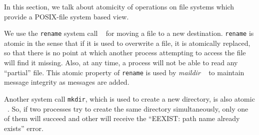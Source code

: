 In this section, we talk about atomicity of operations on file systems which provide a POSIX-file system based view.

We use the \texttt{rename} system call ~\cite{renamemanpage} for moving a file to a new destination. \texttt{rename} is atomic in the sense that if it is used to overwrite a file, it is atomically replaced, so that there is no point at which another process attempting to access the file will find it missing. Also, at any time, a process will not be able to read any ``partial'' file. This atomic property of \texttt{rename} is used by \textit{maildir} ~\cite{bernstein1995using}
to maintain message integrity as messages are added.

Another system call \texttt{mkdir}, which is used to create a new directory, is also atomic ~\cite{mkdirposix}. So, if two processes try to create the same directory simultaneously, only one of them will succeed and other will receive the ``EEXIST: path name already exists'' error.
